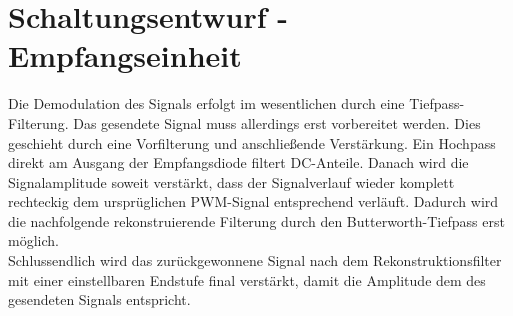 \section{Schaltungsentwurf - Empfangseinheit}
Die Demodulation des Signals erfolgt im wesentlichen durch eine Tiefpass-Filterung. Das gesendete Signal muss allerdings erst vorbereitet werden. Dies geschieht durch eine Vorfilterung und anschließende Verstärkung. Ein Hochpass direkt am Ausgang der Empfangsdiode filtert DC-Anteile. Danach wird die Signalamplitude soweit verstärkt, dass der Signalverlauf wieder komplett rechteckig dem ursprüglichen PWM-Signal entsprechend verläuft. Dadurch wird die nachfolgende rekonstruierende Filterung durch den Butterworth-Tiefpass erst möglich.\\ Schlussendlich wird das zurückgewonnene Signal nach dem Rekonstruktionsfilter mit einer einstellbaren Endstufe final verstärkt, damit die Amplitude dem des gesendeten Signals entspricht.\\

